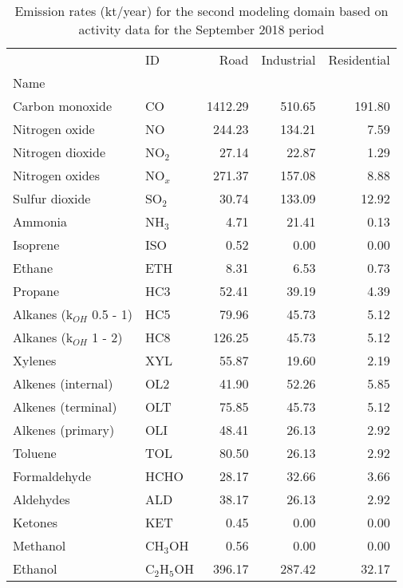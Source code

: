 \begin{table}
\centering
\caption{Emission rates (kt/year) for the second modeling domain based on activity data for the September 2018 period}
\label{tab:emi_d02}
\begin{tabular}{llrrr}
\toprule
{} &            ID &     Road &  Industrial &  Residential \\
Name                       &               &          &             &              \\
\midrule
Carbon monoxide            &            CO &  1412.29 &      510.65 &       191.80 \\
Nitrogen oxide             &            NO &   244.23 &      134.21 &         7.59 \\
Nitrogen dioxide           &        NO$_2$ &    27.14 &       22.87 &         1.29 \\
Nitrogen oxides            &        NO$_x$ &   271.37 &      157.08 &         8.88 \\
Sulfur dioxide             &        SO$_2$ &    30.74 &      133.09 &        12.92 \\
Ammonia                    &        NH$_3$ &     4.71 &       21.41 &         0.13 \\
Isoprene                   &           ISO &     0.52 &        0.00 &         0.00 \\
Ethane                     &           ETH &     8.31 &        6.53 &         0.73 \\
Propane                    &           HC3 &    52.41 &       39.19 &         4.39 \\
Alkanes (k$_{OH}$ 0.5 - 1) &           HC5 &    79.96 &       45.73 &         5.12 \\
Alkanes (k$_{OH}$ 1 - 2)   &           HC8 &   126.25 &       45.73 &         5.12 \\
Xylenes                    &           XYL &    55.87 &       19.60 &         2.19 \\
Alkenes (internal)         &           OL2 &    41.90 &       52.26 &         5.85 \\
Alkenes (terminal)         &           OLT &    75.85 &       45.73 &         5.12 \\
Alkenes (primary)          &           OLI &    48.41 &       26.13 &         2.92 \\
Toluene                    &           TOL &    80.50 &       26.13 &         2.92 \\
Formaldehyde               &          HCHO &    28.17 &       32.66 &         3.66 \\
Aldehydes                  &           ALD &    38.17 &       26.13 &         2.92 \\
Ketones                    &           KET &     0.45 &        0.00 &         0.00 \\
Methanol                   &      CH$_3$OH &     0.56 &        0.00 &         0.00 \\
Ethanol                    &  C$_2$H$_5$OH &   396.17 &      287.42 &        32.17 \\
\bottomrule
\end{tabular}
\end{table}



